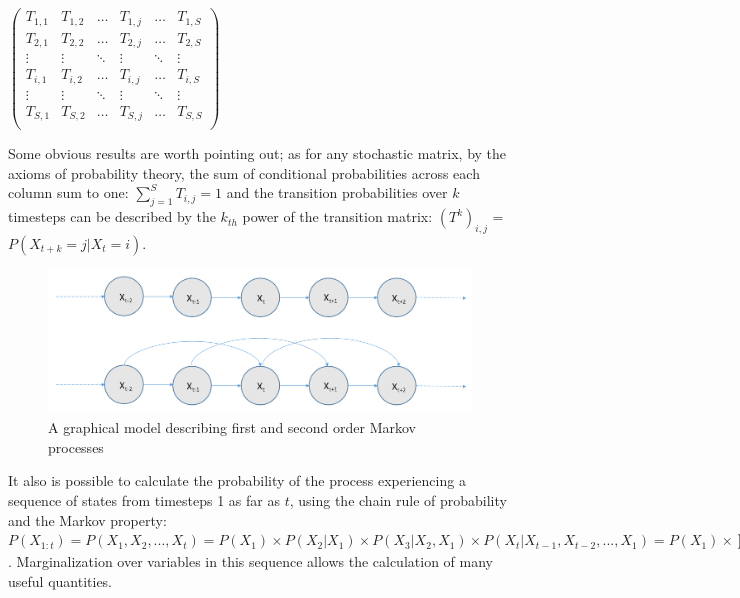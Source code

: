 \begin{center}
{$\displaystyle \left({\begin{matrix}T_{1,1}&T_{1,2}&\dots &T_{1,j}&\dots &T_{1,S}\\T_{2,1}&T_{2,2}&\dots &T_{2,j}&\dots &T_{2,S}\\\vdots &\vdots &\ddots &\vdots &\ddots &\vdots \\T_{i,1}&T_{i,2}&\dots &T_{i,j}&\dots &T_{i,S}\\\vdots &\vdots &\ddots &\vdots &\ddots &\vdots \\T_{S,1}&T_{S,2}&\dots &T_{S,j}&\dots &T_{S,S}\\\end{matrix}}\right)$}
\end{center}
\par

Some obvious results are worth pointing out; as for any stochastic matrix, by the axioms of probability theory, the sum of conditional probabilities across each column sum to one: {$\displaystyle \sum _{j=1}^{S}T_{i,j}=1$} and the transition probabilities over $k$ timesteps can be described by the $k_{th}$ power of the transition matrix: ${(T^k)}_{i,j}$ = $P(X_{t+k} = j | X_{t} = i)$. 
\begin{figure}[b!]
    \centering
    \includegraphics[width=0.8\linewidth]{Chapters/BackgroundKnowledgeAndRelatedWork/MultiAgentTargetDetectionBackground/Figs/MarkovProcesses/MarkovProcesses.png}
    \caption{A graphical model describing first and second order Markov processes}
    \label{fig:markov-processes}
\end{figure}
It also is possible to calculate the probability of the process experiencing a sequence of states from timesteps 1 as far as $t$, using the chain rule of probability and the Markov property:
$P(X_{1:t}) = P(X_1, X_2, ..., X_t) = P(X_1)\times P(X_2 | X_1)\times P(X_3 | X_2, X_1) \times P(X_t | X_{t-1}, X_{t-2}, ... , X_1) = P(X_1) \times \prod_{i=2}^{t}{P(X_i | x_{i-1})}$. Marginalization over variables in this sequence allows the calculation of many useful quantities.
\par

